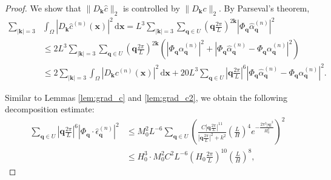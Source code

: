 \documentclass[review,onefignum,onetabnum]{siamart250211}
\begin{document}
\begin{proof}
We show that $\|D_{\mathbf{k}} \hat{c}\|_2$ is controlled by $\|D_{\mathbf{k}} c\|_2$. By Parseval's theorem, 
\begin{equation}
\begin{aligned}
\sum_{|\mathbf{k}|=3}& \int_{\Omega} |D_{\mathbf{k}} \hat{c}^{(n)}( \mathbf{x})|^2 \, \mathrm{d}\mathbf{x} = L^3\sum_{|\mathbf{k}|=3} \sum_{\mathbf{q}\in U} \left(\mathbf{q}\frac{2\pi}{L} \right)^{2\mathbf{k}}\left|\Phi_{\mathbf q}\hat{\alpha}^{(n)}_{\mathbf{q}}\right|^2\\
&\leq 2L^3\sum_{|\mathbf{k}|=3} \sum_{\mathbf{q}\in U} \left(\mathbf{q}\frac{2\pi}{L} \right)^{2\mathbf{k}}\left(\left|\Phi_{\mathbf q}\alpha^{(n)}_{\mathbf{q}}\right|^2 + \left|\Phi_{\mathbf q}\hat{\alpha}^{(n)}_{\mathbf{q}}-\Phi_{\mathbf q}\alpha^{(n)}_{\mathbf{q}}\right|^2 \right)\\
&\leq 2\sum_{|\mathbf{k}|=3} \int_{\Omega} |D_{\mathbf{k}} c^{(n)}(\mathbf{x})|^2 \, \mathrm{d}\mathbf{x} + 20L^3 \sum_{\mathbf{q}\in U} \left|\mathbf{q}\frac{2\pi}{L} \right|^6\left|\Phi_{\mathbf q}\hat{\alpha}^{(n)}_{\mathbf{q}}-\Phi_{\mathbf q}\alpha^{(n)}_{\mathbf{q}}\right|^2.
\end{aligned}
\end{equation}

Similar to Lemmas \ref{lem:grad_c} and \ref{lem:grad_c2}, we obtain the following decomposition estimate:
\begin{equation}
  \begin{aligned}
    \sum_{\mathbf{q} \in U} \left| \mathbf{q} \frac{2\pi}{L}\right|^6\left| \Phi_{\mathbf q}\cdot \hat{\epsilon}_{\mathbf{q}}^{(n)} \right|^2 
    &\leq M_0^2 L^{-6} \sum_{\mathbf{q} \in U} \left(\frac{C\left|\mathbf{q} \frac{2\pi}{L}\right|^{11}}{\left|\mathbf{q} \frac{2\pi}{L}\right|^2 + k^2} \left( \frac{L}{H} \right)^4 e^{-\frac{2\pi ^2|\mathbf q|^2}{H_0^2}}\right) ^2 \\
    &\leq H_0^3 \cdot M_0^2 C^2 L^{-6} \left( H_0 \frac{2\pi}{L} \right)^{10} \left( \frac{L}{H} \right)^8,
  \end{aligned}
  \label{eq:energy_sum_low_freq13}
\end{equation}


\end{proof}
\end{document}
